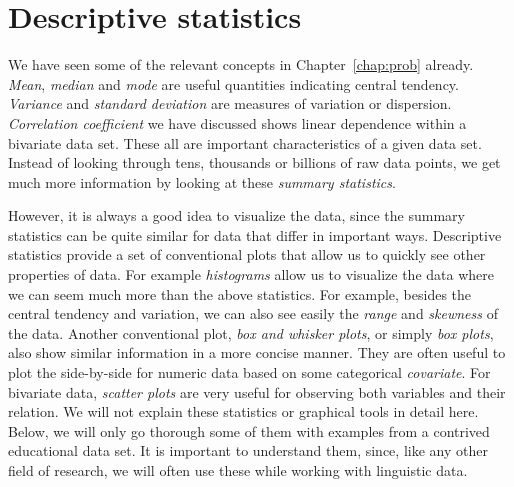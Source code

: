 \section{Descriptive statistics}

We have seen some of the relevant concepts
in Chapter~\ref{chap:prob} already.
\emph{Mean}, \emph{median} and \emph{mode} are useful quantities
indicating central tendency. 
\emph{Variance} and \emph{standard deviation} are
measures of variation or dispersion.
\emph{Correlation coefficient} we have discussed shows
linear dependence within a bivariate data set.
These all are important characteristics of a given data set.
Instead of looking through tens, thousands or billions of raw data points,
we get much more information by looking at these \emph{summary statistics}.

However, it is always a good idea to visualize the data,
since the summary statistics can be quite similar
for data that differ in important ways.
Descriptive statistics provide a set of conventional plots that allow us
to quickly see other properties of data.
For example \emph{histograms} allow us to visualize the data
where we can seem much more than the above statistics.
For example, besides the central tendency and variation,
we can also see easily the \emph{range} and \emph{skewness} of the data.
Another conventional plot, \emph{box and whisker plots},
or simply \emph{box plots},
also show similar information in a more concise manner.
They are often useful to plot the side-by-side
for numeric data based on some categorical \emph{covariate}.
For bivariate data,
\emph{scatter plots} are very useful for observing
both variables and their relation.
We will not explain these statistics or graphical tools in detail here.
Below,
we will only go thorough some of them
with examples from a contrived educational data set.
It is important to understand them,
since, like any other field of research,
we will often use these while working with linguistic data.

